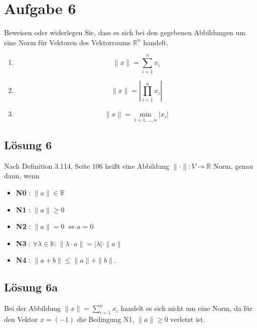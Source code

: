 \documentclass[main.tex]{subfiles}
\begin{document}
\section{Aufgabe 6}
Beweisen oder widerlegen Sie, dass es sich bei den gegebenen Abbildungen um eine Norm für Vektoren des Vektorraums $\mathbb{R}^{n}$ handelt.


\begin{enumerate}
    \item \begin{equation*}
        \| x\| =\sum _{i=1}^{n} x_{i}
        \end{equation*}
    \item \begin{equation*}
        \| x\| =\left| \prod _{i=1}^{n} x_{i}\right| 
        \end{equation*}
    \item \begin{equation*}
        \| x\| =\underset{i=1,\dotsc ,n}{\min}| x_{i}| 
        \end{equation*}
\end{enumerate}

\subsection{Lösung 6}

Nach Definition 3.114, Seite 106 heißt eine Abbildung $\| \cdot \| :V\rightarrow \mathbb{R}$ Norm, genau dann, wenn 

\begin{itemize}
    \item \textbf{N0} :\textbf{ }$\| a\| \in \mathbb{R}$
    \item \textbf{N1} : $\| a\| \geq 0$
    \item \textbf{N2} : $\| a\| =0\ \Leftrightarrow a=0$
    \item \textbf{N3} : $\forall \lambda \in \mathbb{K} :\| \lambda \cdotp a\| =| \lambda | \cdotp \| a\| $
    \item \textbf{N4} : $\| a+b\| \leq \| a\| +\| b\| $.
\end{itemize}







\subsection{Lösung 6a}

Bei der Abbildung $\| x\| =\sum _{i=1}^{n} x_{i}$ handelt es sich nicht um eine Norm, da für den Vektor $x=( -1)$ die Bedingung N1, $\| a\| \geq 0$ verletzt ist.
\end{document}
